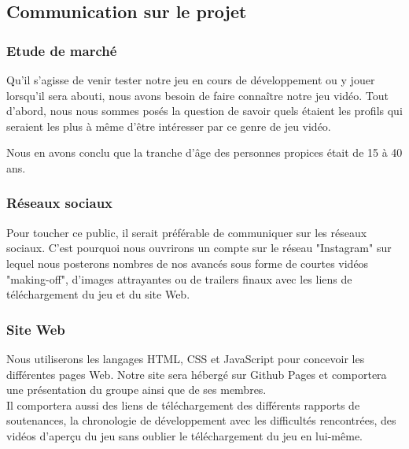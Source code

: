 \documentclass[12pt]{article}
\begin{document}
        \subsection{Communication sur le projet}
        
            \subsubsection{Etude de marché}
                Qu'il s'agisse de venir tester notre jeu en cours de développement ou y jouer lorsqu'il sera abouti, nous avons besoin de faire connaître notre jeu vidéo. Tout d'abord, nous nous sommes posés la question de savoir quels étaient les profils qui seraient les plus à même d'être intéresser par ce genre de jeu vidéo. 
                \par Nous en avons conclu que la tranche d'âge des personnes propices était de 15 à 40 ans.
            \clearpage
            \subsubsection{Réseaux sociaux} 
               Pour toucher ce public, il serait préférable de communiquer sur les réseaux sociaux. C'est pourquoi nous ouvrirons un compte sur le réseau "Instagram" sur lequel nous posterons nombres de nos avancés sous forme de courtes vidéos "making-off", d'images attrayantes ou de trailers finaux avec les liens de téléchargement du jeu et du site Web.
            
            \subsubsection{Site Web}
                Nous utiliserons les langages HTML, CSS et JavaScript pour concevoir les différentes pages Web.
                Notre site sera hébergé sur Github Pages et comportera une présentation du groupe ainsi que de ses membres. 
                \\
                Il comportera aussi des liens de téléchargement des différents rapports de soutenances, la chronologie de développement avec les difficultés rencontrées, des vidéos d'aperçu du jeu sans oublier le téléchargement du jeu en lui-même.
        
            
\end{document}
